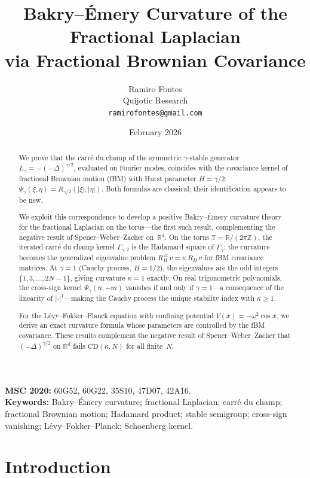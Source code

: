 \documentclass[11pt,a4paper]{article}
\title{Bakry--\'Emery Curvature of the Fractional Laplacian\\
via Fractional Brownian Covariance}
\author{Ramiro Fontes\\
Quijotic Research\\
\texttt{ramirofontes@gmail.com}}
\date{February 2026}
\theoremstyle{plain}
\theoremstyle{definition}
\theoremstyle{remark}
\newcommand{\R}{\mathbb{R}}
\newcommand{\Z}{\mathbb{Z}}
\newcommand{\T}{\mathbb{T}}
\begin{document}
\maketitle

\begin{abstract}
We prove that the carr\'e du champ of the symmetric $\gamma$-stable
generator $L_\gamma = -(-\Delta)^{\gamma/2}$, evaluated on Fourier modes,
coincides with the covariance kernel of fractional Brownian motion (fBM)
with Hurst parameter $H = \gamma/2$:
$\Psi_\gamma(\xi,\eta) = R_{\gamma/2}(|\xi|,|\eta|)$.
Both formulas are classical; their identification appears to be new.

We exploit this correspondence to develop a positive Bakry--\'Emery
curvature theory for the fractional Laplacian on the torus---the
first such result, complementing the negative result of
Spener--Weber--Zacher on~$\R^d$.
On the torus $\T = \R/(2\pi\Z)$, the iterated carr\'e du champ
kernel $\Gamma_{\gamma,2}$ is the Hadamard square of $\Gamma_\gamma$:
the curvature becomes the generalized eigenvalue problem
$R_H^{\circ 2}\,v = \kappa\,R_H\,v$ for fBM covariance matrices.
At $\gamma = 1$ (Cauchy process, $H = 1/2$), the eigenvalues are the
odd integers $\{1,3,\ldots,2N{-}1\}$, giving curvature $\kappa = 1$
exactly.
On real trigonometric polynomials, the cross-sign kernel
$\Psi_\gamma(n,-m)$ vanishes if and only if $\gamma = 1$---a
consequence of the linearity of $|\cdot|^1$---making the Cauchy
process the unique stability index with $\kappa \geq 1$.

For the L\'evy--Fokker--Planck equation with confining potential
$V(x) = -\omega^2\cos x$, we derive an exact curvature formula
whose parameters are controlled by the fBM covariance.
These results complement the negative result of Spener--Weber--Zacher
that $(-\Delta)^{\gamma/2}$ on $\R^d$ fails
$\mathrm{CD}(\kappa,N)$ for all finite~$N$.
\end{abstract}

\medskip
\noindent\textbf{MSC 2020:} 60G52, 60G22, 35S10, 47D07, 42A16.\\
\textbf{Keywords:} Bakry--\'Emery curvature; fractional Laplacian;
carr\'e du champ; fractional Brownian motion; Hadamard product;
stable semigroup; cross-sign vanishing; L\'evy--Fokker--Planck;
Schoenberg kernel.


\section{Introduction}\label{sec:intro}
\end{document}
